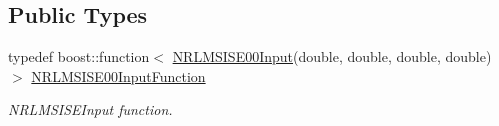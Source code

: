 \subsection*{Public Types}
\begin{DoxyCompactItemize}
\item 
typedef boost\+::function$<$ \hyperlink{structtudat_1_1aerodynamics_1_1NRLMSISE00Input}{N\+R\+L\+M\+S\+I\+S\+E00\+Input}(double, double, double, double) $>$ \hyperlink{classtudat_1_1aerodynamics_1_1NRLMSISE00Atmosphere_aee0e57056d5fc68264773dd94b8b8f3b}{N\+R\+L\+M\+S\+I\+S\+E00\+Input\+Function}
\begin{DoxyCompactList}\small\item\em N\+R\+L\+M\+S\+I\+S\+E\+Input function. \end{DoxyCompactList}\end{DoxyCompactItemize}
